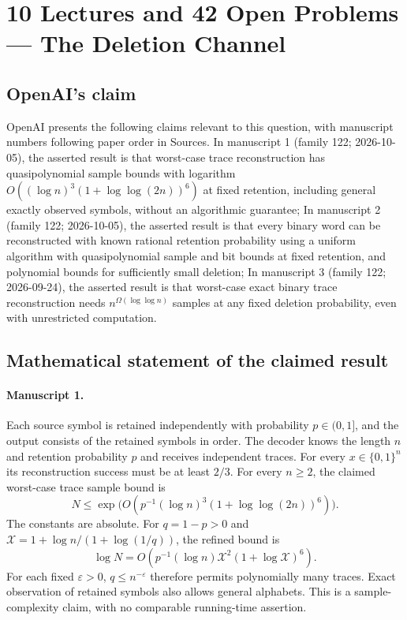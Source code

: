 \documentclass[11pt]{article}
\begin{document}
\section*{10 Lectures and 42 Open Problems — The Deletion Channel}

\subsection{OpenAI's claim}
OpenAI presents the following claims relevant to this question, with manuscript numbers following paper order in Sources. In manuscript 1 (family 122; 2026-10-05), the asserted result is that worst-case trace reconstruction has quasipolynomial sample bounds with logarithm $O((\log n)^3(1+\log\log(2n))^6)$ at fixed retention, including general exactly observed symbols, without an algorithmic guarantee; In manuscript 2 (family 122; 2026-10-05), the asserted result is that every binary word can be reconstructed with known rational retention probability using a uniform algorithm with quasipolynomial sample and bit bounds at fixed retention, and polynomial bounds for sufficiently small deletion; In manuscript 3 (family 122; 2026-09-24), the asserted result is that worst-case exact binary trace reconstruction needs $n^{\Omega(\log\log n)}$ samples at any fixed deletion probability, even with unrestricted computation.

\subsection{Mathematical statement of the claimed result}
\paragraph{Manuscript 1.}
Each source symbol is retained independently with probability $p\in(0,1]$, and the output consists of the retained symbols in order. The decoder knows the length $n$ and retention probability $p$ and receives independent traces. For every $x\in\{0,1\}^n$ its reconstruction success must be at least $2/3$. For every $n\ge2$, the claimed worst-case trace sample bound is
\[
 N\le\exp\bigl(O(p^{-1}(\log n)^3(1+\log\log(2n))^6)\bigr).
\]
The constants are absolute. For $q=1-p>0$ and $\mathcal X=1+\log n/(1+\log(1/q))$, the refined bound is
\[
 \log N=O(p^{-1}(\log n)\mathcal X^2(1+\log\mathcal X)^6).
\]
For each fixed $\varepsilon>0$, $q\le n^{-\varepsilon}$ therefore permits polynomially many traces. Exact observation of retained symbols also allows general alphabets. This is a sample-complexity claim, with no comparable running-time assertion.
\end{document}
